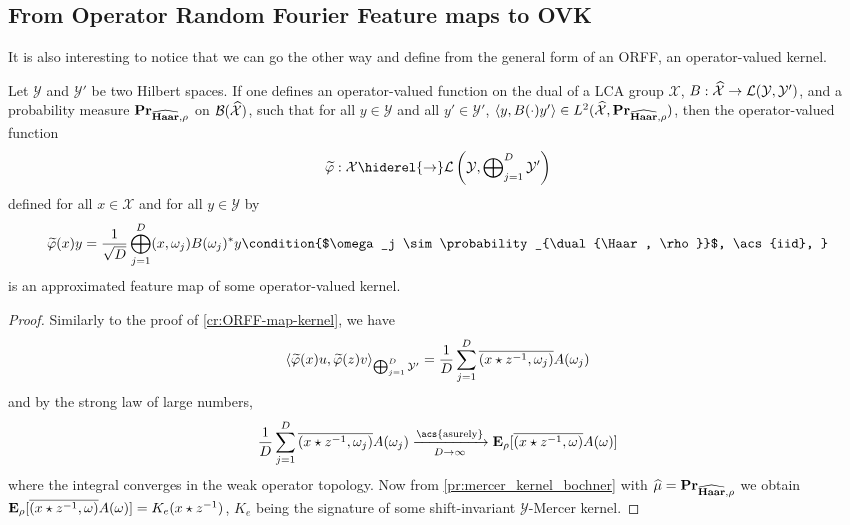 \subsection{From Operator Random Fourier Feature maps to OVK}
It is also interesting to notice that we can go the other way and define from
the general form of an \acl{ORFF}, an operator-valued kernel.
\begin{proposition}
    \label{pr:ORFF-map} Let $\mathcal{Y}$ and $\mathcal{Y}'$ be two Hilbert
    spaces. If one defines an operator-valued function on the dual of a LCA
    group $\mathcal{X}$, $B: \widehat{\mathcal{X}} \to
    \mathcal{L}(\mathcal{Y},\mathcal{Y}')$, and a probability measure
    ${\mathbf{{Pr}}}_{\widehat{\mathbf{Haar}},\rho}$ on $\mathcal{B}(\widehat{\mathcal{X}})$,
    such that for all $y\in\mathcal{Y}$ and all $y'\in\mathcal{Y}'$, $\langle y,
    B(\cdot)y'\rangle \in L^2(\widehat{\mathcal{X}}, {\mathbf{{Pr}}}_{\widehat{\mathbf{Haar}},\rho})$,
    then the operator-valued function 
    \begin{dmath*}
        \tildePhi{\omega}: \mathcal{X} \hiderel{\to}
        \mathcal{L}\left(\mathcal{Y}, \vect_{j=1}^D\mathcal{Y}'\right)
    \end{dmath*}
    defined for all $x \in \mathcal{X}$ and for all $y\in\mathcal{Y}$ by
    \begin{dmath}
        \label{eq:phitilde}
        \tildePhi{\omega}(x)y
        = \frac{1}{\sqrt{D}}\Vect_{j=1}^D\pairing{x,
        \omega_j}B(\omega_j)^\adjoint y\condition{$\omega_j \sim
        \probability_{\dual{\Haar, \rho}}$, \acs{iid}, }
    \end{dmath}
    is an approximated feature map of some operator-valued
    kernel.
\end{proposition}
\begin{proof}
    Similarly to the proof of \cref{cr:ORFF-map-kernel}, we have
    \begin{dmath*}
        \inner*{\tildePhi{\omega}(x)u,\tildePhi{\omega}(z)v}_{\Vect_{j=1}^D
        \mathcal{Y}'} = 
        \frac{1}{D} \sum_{j=1}^D
        \conj{\pairing{x\groupop\inv{z},\omega_j}} A(\omega_j)
    \end{dmath*}
    and by the strong law of large numbers,
    \begin{dmath*}
        \frac{1}{D} \sum_{j=1}^D
        \conj{\pairing{x\groupop\inv{z},\omega_j}} A(\omega_j)
        \converges{\acs{asurely}}{D \to \infty}
        \expectation_{\rho}[\conj{\pairing{x \groupop
        z^{-1}, \omega} }A(\omega)]
    \end{dmath*}
    where the integral converges in the weak operator topology.  Now  from
    \cref{pr:mercer_kernel_bochner} with
    $\widehat{\mu}={\mathbf{{Pr}}}_{\widehat{\mathbf{Haar}}, \rho}$ we obtain
    ${\mathbf{{E}}}_{\rho}[\overline{(x \star z^{-1}, \omega) }A(\omega)]
    = K_e(x\star{z}^{-1})$, $K_e$ being the signature of some shift-invariant
    $\mathcal{Y}$-Mercer kernel.
\end{proof}
